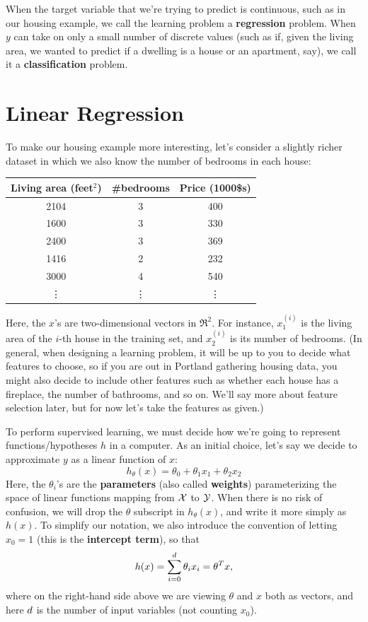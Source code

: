 \documentclass{article}
\begin{document}
When the target variable that we're trying to predict is continuous, such as in our housing
example, we call the learning problem a {\bf regression} problem.  When $y$ can take
on only a small number of discrete values (such as if, given the living area,
we wanted to predict if a dwelling is a house or an apartment, say), we call
it a {\bf classification} problem.

\newpage
\part{Linear Regression}

To make our housing example more interesting, let's consider a slightly richer
dataset in which we also know the number of bedrooms in each house:

\begin{center}
\begin{tabular}{c|c|c}
Living area (feet$^2$) & \#bedrooms & Price (1000\$s) \\ \hline
2104 & 3 & 400  \\
1600 & 3 & 330  \\
2400 & 3 & 369  \\
1416 & 2 & 232  \\
3000 & 4 & 540  \\
\vdots & \vdots  & \vdots
\end{tabular}
\end{center}

Here, the $x$'s are two-dimensional vectors in $\Re^2$.  For instance,
$x^{(i)}_1$ is the living area of the $i$-th house in the training set, and
$x^{(i)}_2$ is its number of bedrooms.  (In general, when designing a learning
problem, it will be up to you to decide what features to choose, so if you
are out in Portland gathering housing data, you might also decide to include
other features such as whether each house has a fireplace, the number of
bathrooms, and so on.  We'll say more about feature selection later, but
for now let's take the features as given.)

To perform supervised learning, we must decide how we're going to
represent functions/hypotheses $h$ in a computer.  As an initial choice,
let's say we decide to approximate $y$ as a linear function of $x$:
\[
h_\theta(x) = \theta_0 + \theta_1 x_1 + \theta_2 x_2
\]
Here, the $\theta_i$'s are the {\bf parameters} (also called {\bf weights})
parameterizing the space
of linear functions mapping from ${\cal X}$ to ${\cal Y}$.  When there is no
risk of confusion, we will drop the $\theta$ subscript in $h_\theta(x)$,
and write it more simply as $h(x)$.  To simplify our notation, we also
introduce the convention of letting $x_0 = 1$ (this is the
{\bf intercept term}), so that
\[
h(x) = \sum_{i=0}^{d} \theta_i x_i = \theta^T x,
\]
where on the right-hand side above we are viewing $\theta$ and $x$ both as vectors, and
here ${d}$ is the number of input variables (not counting $x_0$).
\end{document}
